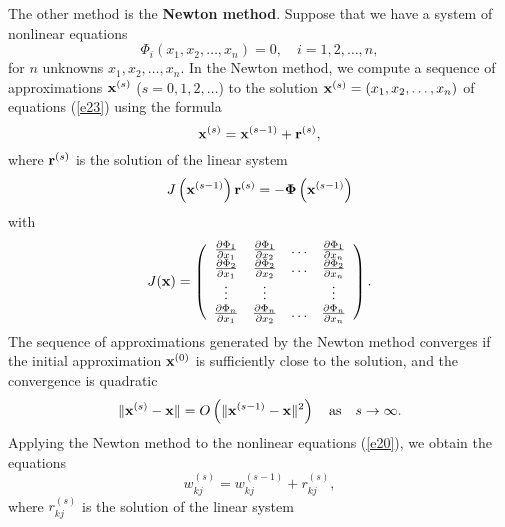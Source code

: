   
 
The other method is the {\bf Newton method}. Suppose that
we have  a system of nonlinear equations
\begin{equation}
\Phi_{i}(x_{1}, x_{2},\dots,x_{n})=0, \quad i=1,2,\dots, n,\label{e23}
\end{equation}
for $n$ unknowns $x_{1}, x_{2},\dots,x_{n}$. In the Newton method, we compute a sequence
of approximations ${\bf x}^{(s)}$ ($s=0,1,2,\dots$) to the solution
${\bf x}^{(s)}=(x_{1}, x_{2},\dots,x_{n})$ of equations (\ref{e23}) using the formula
\begin{equation}
{\bf x}^{(s)}={\bf x}^{(s-1)}+{\bf r}^{(s)},\label{e24}
\end{equation}
where ${\bf r}^{(s)}$ is the solution of the linear system
\begin{equation}
J\left({\bf x}^{(s-1)}\right){\bf r}^{(s)}=-{\boldsymbol{\Phi}}\left({\bf x}^{(s-1)}\right) \label{e25}
\end{equation}
with
\begin{equation}
J({\bf x})=\left(
\begin{array}{cccc}
\frac{{\partial} \Phi_{1}}{{\partial} x_{1}} &\frac{{\partial} \Phi_{1}}{{\partial} x_{2}} &\dots &\frac{{\partial} \Phi_{1}}{{\partial} x_{n}} \\
\frac{{\partial} \Phi_{2}}{{\partial} x_{1}} &\frac{{\partial} \Phi_{2}}{{\partial} x_{2}} &\dots &\frac{{\partial} \Phi_{2}}{{\partial} x_{n}} \\
\vdots &\vdots &   &\vdots \\
\frac{{\partial} \Phi_{n}}{{\partial} x_{1}} &\frac{{\partial} \Phi_{n}}{{\partial} x_{2}} &\dots &\frac{{\partial} \Phi_{n}}{{\partial} x_{n}}
\end{array}\right).  \label{e26}
\end{equation}
The sequence of approximations generated by the Newton method converges if
the initial approximation ${\bf x}^{(0)}$ is sufficiently close to the solution, and
the convergence is quadratic
\[
\Vert {\bf x}^{(s)}-{\bf x}\Vert=O\left(\Vert {\bf x}^{(s-1)}-{\bf x}\Vert^2
\right) \quad {\rm as} \quad s\to\infty.
\]
Applying the Newton method to the nonlinear equations (\ref{e20}), we obtain
the equations
\begin{equation}
w_{kj}^{(s)}=w_{kj}^{(s-1)}+r_{kj}^{(s)},\label{e27}
\end{equation}
where $r_{kj}^{(s)}$ is the solution of the linear system
